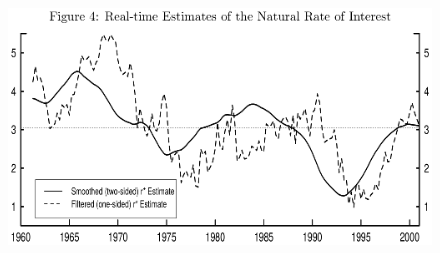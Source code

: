 \documentclass{beamer}
\begin{document}
\begin{frame}
  \begin{figure}
    \includegraphics[scale=.7]{lw2.eps}
  \end{figure}
\end{frame}



\end{document}
